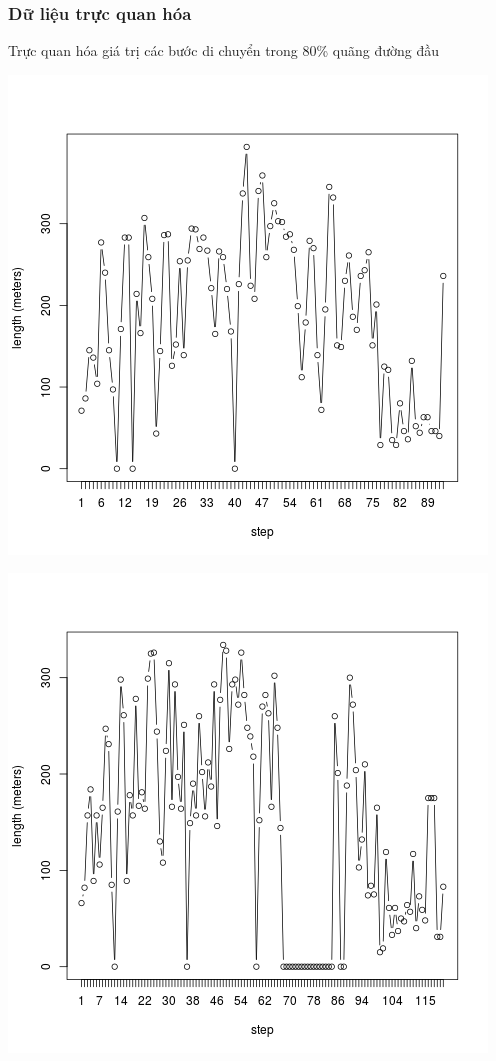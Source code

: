 \documentclass{beamer}
\begin{document}

\begin{frame}[t]
\frametitle{Dữ liệu trực quan hóa}Trực quan hóa giá trị các bước di chuyển trong 80\% quãng đường đầu\\
\begin{center}
\begin{minipage}{0.48\linewidth}
\includegraphics[width=\linewidth]{test_80_1}
\end{minipage}%
\hfill
\begin{minipage}{0.49\linewidth}
\includegraphics[width=\linewidth]{test_80_2}
\end{minipage}
\end{center}
\end{frame}
\end{document}
